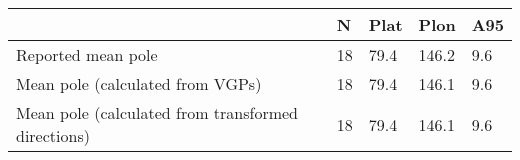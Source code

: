 \begin{tabular}{lllll}
\toprule
{} &   N &  Plat &   Plon &  A95 \\
\midrule
Reported mean pole                                 &  18 &  79.4 &  146.2 &  9.6 \\
Mean pole (calculated from VGPs)                   &  18 &  79.4 &  146.1 &  9.6 \\
Mean pole (calculated from transformed directions) &  18 &  79.4 &  146.1 &  9.6 \\
\bottomrule
\end{tabular}
